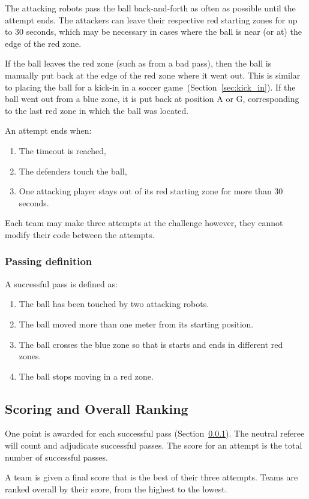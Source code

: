 The attacking robots pass the ball back-and-forth as often as possible until the attempt ends. The attackers can leave their respective red starting zones for up to 30 seconds, which may be necessary in cases where the ball is near (or at) the edge of the red zone.

If the ball leaves the red zone (such as from a bad pass), then the ball is manually put back at the edge of the red zone where it went out. This is similar to placing the ball for a kick-in in a soccer game~(\cf Section~\ref{sec:kick_in}).  If the ball went out from a blue zone, it is put back at position A or G, corresponding to the last red zone in which the ball was located.
    
An attempt ends when: 
\begin{enumerate}
    \item The timeout is reached,
    \item The defenders touch the ball,
    \item One attacking player stays out of its red starting zone for more than 30 seconds.
\end{enumerate}

Each team may make three attempts at the challenge however, they cannot modify their code between the attempts.

\subsubsection{Passing definition}
\label{sec:pass-definition}
A successful pass is defined as:
\begin{enumerate}
    \item The ball has been touched by two attacking robots.
    \item The ball moved more than one meter from its starting position.
    \item The ball crosses the blue zone so that is starts and ends in different red zones.
    \item The ball stops moving in a red zone.
\end{enumerate}

\subsection{Scoring and Overall Ranking}
One point is awarded for each successful pass (\cf Section~\ref{sec:pass-definition}). The neutral referee will count and adjudicate successful passes. The score for an attempt is the total number of successful passes.

A team is given a final score that is the best of their three attempts. Teams are ranked overall by their score, from the highest to the lowest. 
